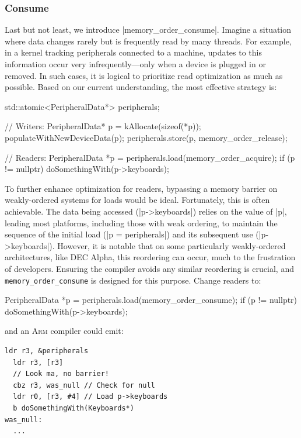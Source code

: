 \documentclass[fontsize=10pt, oneside]{scrartcl}
\newcommand{\monobox}[1]{\mbox{\texttt{#1}}}
\begin{document}
\subsubsection{Consume}

Last but not least, we introduce \cc|memory_order_consume|.
Imagine a situation where data changes rarely but is frequently read by many threads.
For example, in a kernel tracking peripherals connected to a machine,
updates to this information occur very infrequently—only when a device is plugged in or removed.
In such cases, it is logical to prioritize read optimization as much as possible.
Based on our current understanding, the most effective strategy is:
\begin{cppcode}
std::atomic<PeripheralData*> peripherals;

// Writers:
PeripheralData* p = kAllocate(sizeof(*p));
populateWithNewDeviceData(p);
peripherals.store(p, memory_order_release);
\end{cppcode}
\begin{cppcode}
// Readers:
PeripheralData *p = peripherals.load(memory_order_acquire);
if (p != nullptr) {
    doSomethingWith(p->keyboards);
}
\end{cppcode}

To further enhance optimization for readers,
bypassing a memory barrier on weakly-ordered systems for loads would be ideal.
Fortunately, this is often achievable.
The data being accessed (\cpp|p->keyboards|) relies on the value of \cpp|p|,
leading most platforms, including those with weak ordering,
to maintain the sequence of the initial load (\cpp|p = peripherals|) and its subsequent use (\cpp|p->keyboards|).
However, it is notable that on some particularly weakly-ordered architectures, like DEC Alpha,
this reordering can occur, much to the frustration of developers.
Ensuring the compiler avoids any similar reordering is crucial, and \monobox{memory\_order\_consume} is designed for this purpose.
Change readers to:
\begin{cppcode}
PeripheralData *p = peripherals.load(memory_order_consume);
if (p != nullptr) {
    doSomethingWith(p->keyboards);
}
\end{cppcode}
and an \textsc{Arm} compiler could emit:
\begin{lstlisting}[language={[ARM]Assembler}]
  ldr r3, &peripherals
  ldr r3, [r3]
  // Look ma, no barrier!
  cbz r3, was_null // Check for null
  ldr r0, [r3, #4] // Load p->keyboards
  b doSomethingWith(Keyboards*)
was_null:
  ...
\end{lstlisting}
\end{document}
